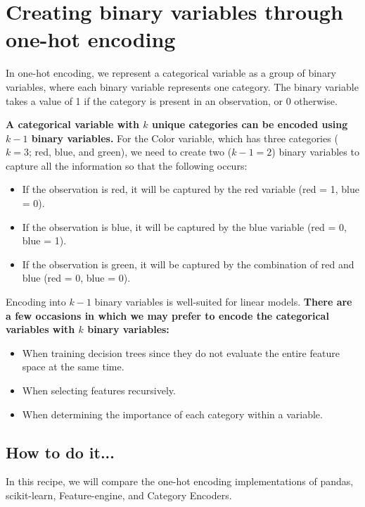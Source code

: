 \section{Creating binary variables through one-hot encoding}
In one-hot encoding, we represent a categorical variable as a group of binary variables, where each binary variable represents one category. The binary variable takes a value of 1 if the category is present in an observation, or 0 otherwise.

\textbf{A categorical variable with $k$ unique categories can be encoded using $k-1$ binary variables.} For the Color variable, which has three categories ($k=3$; red, 
blue, and green), we need to create two ($k - 1 = 2$) binary variables to capture all the information so that the following occurs:
\begin{itemize}
    \item If the observation is red, it will be captured by the red variable (red = 1, blue = 0).
    \item If the observation is blue, it will be captured by the blue variable (red = 0, blue = 1).
    \item If the observation is green, it will be captured by the combination of red and blue (red = 0, 
    blue = 0).    
\end{itemize}

Encoding into $k-1$ binary variables is well-suited for linear models. \textbf{There are a few occasions in which we may prefer to encode the categorical variables with $k$ binary variables:}

\begin{itemize}
    \item When training decision trees since they do not evaluate the entire feature space at the same time.
    \item When selecting features recursively.
    \item When determining the importance of each category within a variable.
\end{itemize}
\subsection{How to do it...}
In this recipe, we will compare the one-hot encoding implementations of pandas, scikit-learn, Feature-engine, and Category Encoders.